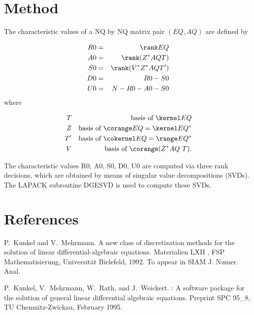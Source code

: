 \section{Method}

The characteristic values of a NQ by NQ matrix pair $(EQ, AQ)$ are
defined by 

\begin{eqnarray*}
  R0 &=& \rank EQ \\
  A0 &=& \rank (Z^* AQ T) \\
  S0 &=& \rank (V^* Z^* AQ T') \\
  D0 &=& R0 - S0 \\
  U0 &=& N - R0 - A0 - S0
\end{eqnarray*}
where 

\begin{eqnarray*}
    T &&\mbox {\rm basis of }\kernel EQ\\
    Z &&\mbox{\rm basis of }\corange EQ=\kernel EQ^* \\
    T' &&\mbox{\rm basis of }\cokernel EQ=\range EQ^*\\
    V &&\mbox{\rm basis of }\corange (Z^*AQ\ T).
\end{eqnarray*}

The characteristic values R0, A0, S0, D0, U0 are computed via three rank
decisions, which are obtained by means of singular value
decompositions (SVDs). The LAPACK subroutine DGESVD is used to compute
these SVDs.  

\section{References}

\begin{thebibliography}{1}

P.~Kunkel and V.~Mehrmann.
\newblock A new class of discretization methods for the solution of linear
  differential-algebraic equations.
\newblock Materialien LXII , FSP Mathematisierung, Universit{\"a}t Bielefeld,
  1992.
\newblock To appear in SIAM J. Numer. Anal.

P.~Kunkel, V.~Mehrmann, W.~Rath, and J.~Weickert.
: A software package for the solution of general linear
  differential algebraic equations.
\newblock Preprint SPC 95\_8, TU Chemnitz-Zwickau, February 1995.

\end{thebibliography}









